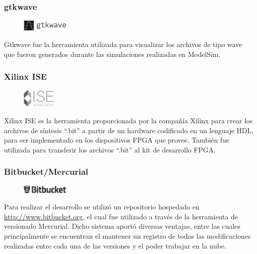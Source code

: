 \subsubsection*{gtkwave}
\begin{figure}
	\vspace{-15pt}
	\begin{center}
		\includegraphics[width=0.20\textwidth]{./figures/logo_gtkwave.png}
	\end{center}
	\vspace{-15pt}
\end{figure}
Gtkwave fue la herramienta utilizada para visualizar los archivos de tipo wave que fueron generados
durante las simulaciones realizadas en ModelSim.

\subsubsection*{Xilinx ISE}
\begin{figure}
	\vspace{-15pt}
	\begin{center}
		\includegraphics[width=0.15\textwidth]{./figures/logo_ise.png}
	\end{center}
	\vspace{-15pt}
\end{figure}
Xilinx ISE es la herramienta proporcionada por la compañía Xilinx para crear los archivos de
síntesis ``.bit'' a partir de un hardware codificado en un lenguaje HDL, para ser implementado en
los dispositivos FPGA que provee. También fue utilizada para transferir los archivos ``.bit'' al
kit de desarrollo FPGA.

\subsubsection*{Bitbucket/Mercurial}
\begin{figure}
	\vspace{-15pt}
	\begin{center}
		\includegraphics[width=0.20\textwidth]{./figures/logo_bitbucket.png}
	\end{center}
	\vspace{-15pt}
\end{figure}
Para realizar el desarrollo se utilizó un repositorio hospedado en
\href{http://www.bitbucket.org}{http://www.bitbucket.org}, el cual fue utilizado a través de la
herramienta de versionado Mercurial. Dicho sistema aportó diversas ventajas, entre las cuales
principalmente se encuentran el mantener un registro de todas las modificaciones realizadas entre
cada una de las versiones y el poder trabajar en la nube.

